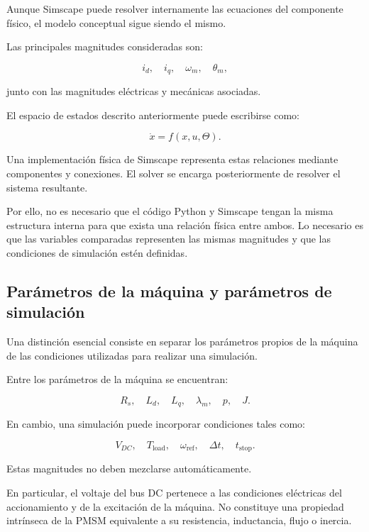 Aunque Simscape puede resolver internamente las ecuaciones del componente físico, el modelo conceptual sigue siendo el mismo.

Las principales magnitudes consideradas son:

\begin{equation}
i_d,\quad i_q,\quad
\omega_m,\quad
\theta_m,
\end{equation}

junto con las magnitudes eléctricas y mecánicas asociadas.

El espacio de estados descrito anteriormente puede escribirse como:

\begin{equation}
\dot{x}=f(x,u,\Theta).
\end{equation}

Una implementación física de Simscape representa estas relaciones mediante componentes y conexiones. El solver se encarga posteriormente de resolver el sistema resultante.

Por ello, no es necesario que el código Python y Simscape tengan la misma estructura interna para que exista una relación física entre ambos. Lo necesario es que las variables comparadas representen las mismas magnitudes y que las condiciones de simulación estén definidas.

\subsection{Parámetros de la máquina y parámetros de simulación}

Una distinción esencial consiste en separar los parámetros propios de la máquina de las condiciones utilizadas para realizar una simulación.

Entre los parámetros de la máquina se encuentran:

\begin{equation}
R_s,\quad L_d,\quad L_q,\quad
\lambda_m,\quad p,\quad J.
\end{equation}

En cambio, una simulación puede incorporar condiciones tales como:

\begin{equation}
V_{DC},
\quad
T_{\mathrm{load}},
\quad
\omega_{\mathrm{ref}},
\quad
\Delta t,
\quad
t_{\mathrm{stop}}.
\end{equation}

Estas magnitudes no deben mezclarse automáticamente.

En particular, el voltaje del bus DC pertenece a las condiciones eléctricas del accionamiento y de la excitación de la máquina. No constituye una propiedad intrínseca de la PMSM equivalente a su resistencia, inductancia, flujo o inercia.

